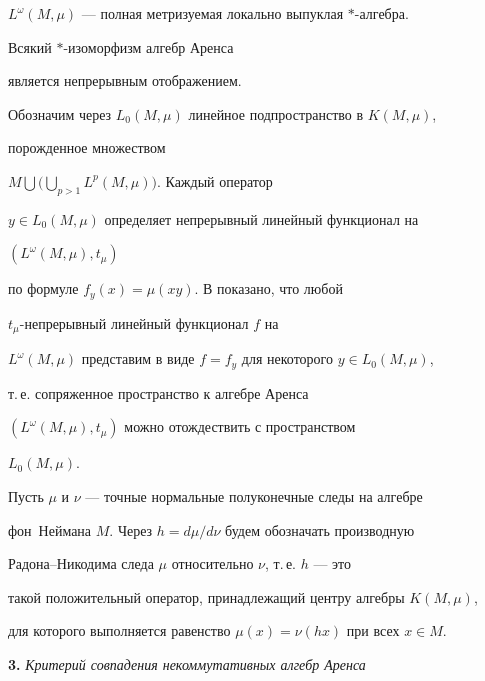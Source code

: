 $L^\omega(M,\mu)$ --- полная метризуемая локально выпуклая $*$-алгебра. 


 


\begin{thm} 


Всякий $*$-изоморфизм алгебр Аренса 


является непрерывным отображением. 


\end{thm} 


 


Обозначим через $L_0(M,\mu)$ линейное подпространство в $K(M,\mu)$, 


порожденное множеством 


$M\bigcup\Big(\bigcup\limits_{p>1}L^p(M,\mu)\Big)$. Каждый оператор 


$y\in L_0(M,\mu)$ определяет непрерывный линейный функционал на 


$(L^\omega(M,\mu),t_\mu)$ 


по формуле $f_y(x)=\mu(xy)$. В \cite{2} показано, что любой 


$t_\mu$-непрерывный линейный функционал $f$ на 


$L^\omega(M,\mu)$ представим в виде $f=f_y$ для некоторого $y\in 


L_0(M,\mu)$, 


т.\,е.{} сопряженное пространство к алгебре Аренса 


$(L^\omega(M,\mu),t_\mu)$ можно отождествить с пространством 


$L_0(M,\mu)$. 


 


Пусть $\mu$ и $\nu$ --- точные нормальные полуконечные следы на алгебре 


фон~Неймана $M$. Через $h=d\mu/d\nu$ будем обозначать производную 


Радона--Никодима следа $\mu$ относительно $\nu$, т.\,е.{} $h$ --- это 


такой положительный оператор, принадлежащий центру алгебры $K(M,\mu)$, 


для которого выполняется равенство $\mu(x)=\nu(hx)$ при всех $x\in M$. 


\medskip 


 


{\bf 3.} {\it Критерий совпадения некоммутативных алгебр Аренса} 


